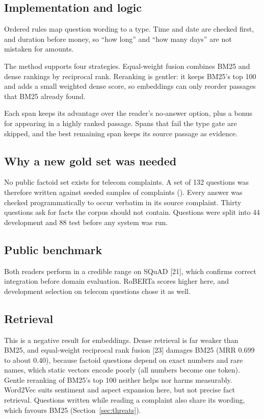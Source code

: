 \documentclass[11pt,a4paper]{article}
\newcommand{\repo}{https://github.com/BharatChandra-sys/NLP-case-study}
\newcommand{\repolink}[2]{\href{\repo/blob/main/#1}{\texttt{\detokenize{#2}}}}
\newcommand{\T}[1]{}
\newcommand{\codefile}[3]{\par\vspace{0pt plus 3.5cm}\penalty-100\vspace{0pt plus -3.5cm}}
\begin{document}
\subsection{Implementation and logic}
\codefile{answer_type}{Question processing: expected answer type}{qa.py}
Ordered rules map question wording to a type. Time and date are checked first, and duration before money, so ``how long'' and ``how many days'' are not mistaken for amounts.
\codefile{rank}{Passage retrieval: BM25, dense, fusion and reranking}{qa.py}
The method supports four strategies. Equal-weight fusion combines BM25 and dense rankings by reciprocal rank. Reranking is gentler: it keeps BM25's top 100 and adds a small weighted dense score, so embeddings can only reorder passages that BM25 already found.
\codefile{answer}{Reading, gating and scoring}{qa.py}
Each span keeps its advantage over the reader's no-answer option, plus a bonus for appearing in a highly ranked passage. Spans that fail the type gate are skipped, and the best remaining span keeps its source passage as evidence.
\codefile{selective_qa}{Evaluating abstention}{metrics.py}
\codefile{retrieval_scores}{Ranking metrics}{metrics.py}

\subsection{Why a new gold set was needed}
No public factoid set exists for telecom complaints. A set of 132 questions was therefore written against seeded samples of complaints (\repolink{data/gold/qa_gold.jsonl}{qa_gold.jsonl}). Every answer was checked programmatically to occur verbatim in its source complaint. Thirty questions ask for facts the corpus should not contain. Questions were split into 44 development and 88 test before any system was run.

\subsection{Public benchmark}
\T{qa_squad}
Both readers perform in a credible range on SQuAD [21], which confirms correct integration before domain evaluation. RoBERTa scores higher here, and development selection on telecom questions chose it as well.

\subsection{Retrieval}
\T{qa_retrieval}
This is a negative result for embeddings. Dense retrieval is far weaker than BM25, and equal-weight reciprocal rank fusion [23] damages BM25 (MRR 0.699 to about 0.40), because factoid questions depend on exact numbers and rare names, which static vectors encode poorly (all numbers become one token). Gentle reranking of BM25's top 100 neither helps nor harms measurably. Word2Vec suits sentiment and aspect expansion here, but not precise fact retrieval. Questions written while reading a complaint also share its wording, which favours BM25 (Section~\ref{sec:threats}).
\end{document}
